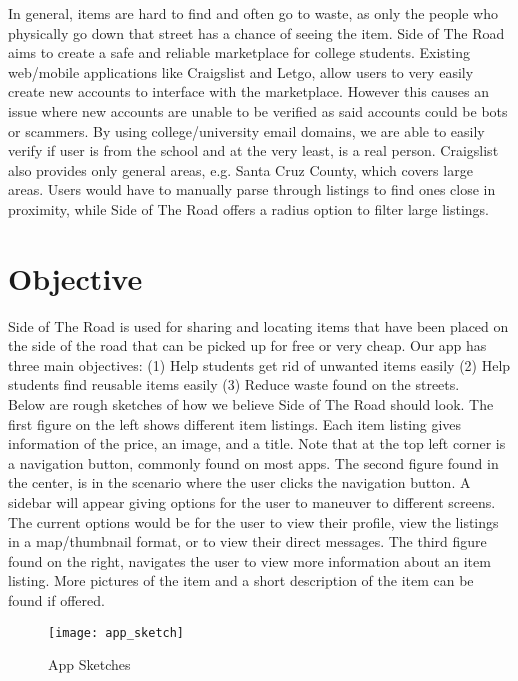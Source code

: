 \documentclass[sigconf]{acmart}
\begin{document}
In general, items are hard to find and often go to waste, as only the people who physically go down that street has a chance of seeing the item. Side of The Road aims to create a safe and reliable marketplace for college students. Existing  web/mobile applications like Craigslist and Letgo, allow users to very easily create new accounts to interface with the marketplace. However this causes an issue where new accounts are unable to be verified as said accounts could be bots or scammers. By using college/university email domains, we are able to easily verify if user is from the school and at the very least, is a real person. Craigslist also provides only general areas, e.g. Santa Cruz County, which covers large areas. Users would have to manually parse through listings to find ones close in proximity, while Side of The Road offers a radius option to filter large listings.


\section{Objective}
Side of The Road is used for sharing and locating items that have been placed on the side of the road that can be picked up for free or very cheap. Our app has three main objectives: (1) Help students get rid of unwanted items easily (2) Help students find reusable items easily (3) Reduce waste found on the streets. \\

Below are rough sketches of how we believe Side of The Road should look. The first figure on the left shows different item listings. Each item listing gives information of the price, an image, and a title. Note that at the top left corner is a navigation button, commonly found on most apps. The second figure found in the center, is in the scenario where the user clicks the navigation button. A sidebar will appear giving options for the user to maneuver to different screens. The current options would be for the user to view their profile, view the listings in a map/thumbnail format, or to view their direct messages. The third figure found on the right, navigates the user to view more information about an item listing. More pictures of the item and a short description of the item can be found if offered.

\begin{figure}[H]
	\texttt{[image: app\_sketch]}
	\caption{App Sketches}
	\label{}
\end{figure}
\end{document}
